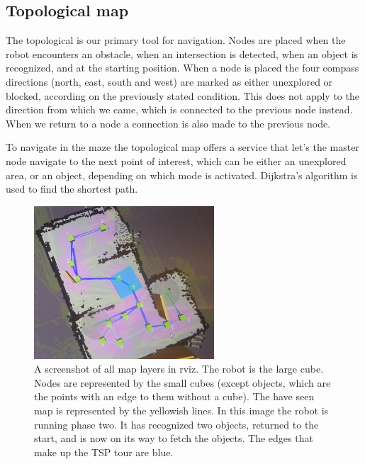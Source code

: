 \subsection{Topological map}
The topological is our primary tool for navigation. Nodes are placed when the robot encounters an obstacle, when an intersection is detected, when an object is recognized, and at the starting position. When a node is placed the four compass directions (north, east, south and west) are marked as either unexplored or blocked, according on the previously stated condition. This does not apply to the direction from which we came, which is connected to the previous node instead. When we return to a node a connection is also made to the previous node.

To navigate in the maze the topological map offers a service that let's the master node navigate to the next point of interest, which can be either an unexplored area, or an object, depending on which mode is activated. Dijkstra's algorithm is used to find the shortest path.

\begin{figure}[h]
\begin{center}
\includegraphics[width=0.6\textwidth]{figures/map.png}
\end{center}
\caption{A screenshot of all map layers in rviz. The robot is the large cube. Nodes are represented by the small cubes (except objects, which are the points with an edge to them without a cube). The have seen map is represented by the yellowish lines. In this image the robot is running phase two. It has recognized two objects, returned to the start, and is now on its way to fetch the objects. The edges that make up the TSP tour are blue.}
\label{fig:arch_controller}
\end{figure}